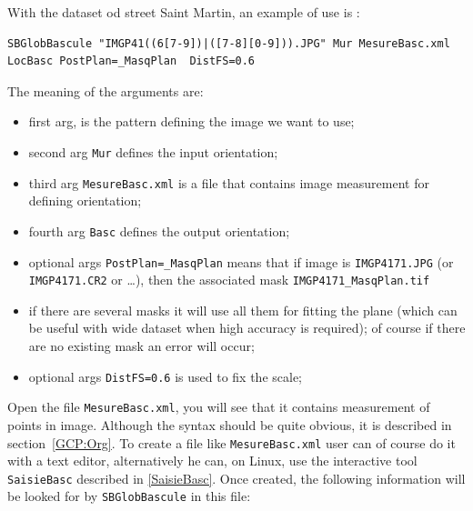 With the dataset od street Saint Martin, an example of use is :

\begin{verbatim}
SBGlobBascule "IMGP41((6[7-9])|([7-8][0-9])).JPG" Mur MesureBasc.xml  LocBasc PostPlan=_MasqPlan  DistFS=0.6
\end{verbatim}

The meaning of the arguments are:

\begin{itemize}
  \item first arg, is the pattern defining the image we want to use;

  \item second arg {\tt Mur} defines the input orientation;

  \item third arg {\tt MesureBasc.xml} is a file that contains image measurement
        for defining orientation;

  \item fourth  arg {\tt Basc} defines the output orientation;

  \item optional args {\tt PostPlan=\_MasqPlan}  means that if image is {\tt IMGP4171.JPG} 
        (or {\tt IMGP4171.CR2} or \dots), then the associated mask {\tt IMGP4171\_MasqPlan.tif}

   \item  if there are several masks it will use all them for
         fitting the plane (which can be useful with wide dataset when high accuracy  is required);
         of course if there are no existing mask an error will occur;
  
  \item optional args {\tt DistFS=0.6} is used to fix the scale;
\end{itemize}


Open the file {\tt MesureBasc.xml}, you will see that it contains measurement
of points in image. Although the syntax should be quite obvious, it is
described in section~\ref{GCP:Org}. To create a file like {\tt MesureBasc.xml}
user can of course do it with a text editor, alternatively he can, on Linux,
use the interactive tool {\tt SaisieBasc}  described in \ref{SaisieBasc}.
Once created, the following information will be looked for by  {\tt SBGlobBascule}
in this file:

